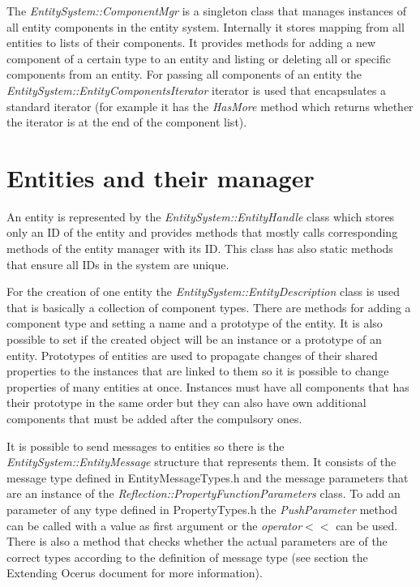 \documentclass[a4paper, 12pt]{report}
\begin{document}
The \emph{EntitySystem::ComponentMgr} is a singleton class that manages instances of all entity components in the entity system. Internally it stores mapping from all entities to lists of their components. It provides methods for adding a new component of a certain type to an entity and listing or deleting all or specific components from an entity. For passing all components of an entity the \emph{EntitySystem::EntityComponentsIterator} iterator is used that encapsulates a standard iterator (for example it has the \emph{HasMore} method which returns whether the iterator is at the end of the component list).

\section{Entities and their manager}

An entity is represented by the \emph{EntitySystem::EntityHandle} class which sto\-res only an ID of the entity and provides methods that mostly calls corresponding methods of the entity manager with its ID. This class has also static methods that ensure all IDs in the system are unique.

For the creation of one entity the \emph{EntitySystem::EntityDescription} class is used that is basically a collection of component types. There are methods for adding a component type and setting a name and a prototype of the entity. It is also possible to set if the created object will be an instance or a prototype of an entity. Prototypes of entities are used to propagate changes of their shared properties to the instances that are linked to them so it is possible to change properties of many entities at once. Instances must have all components that has their prototype in the same order but they can also have own additional components that must be added after the compulsory ones.

It is possible to send messages to entities so there is the \emph{EntitySystem::EntityMessage} structure that represents them. It consists of the message type defined in EntityMessageTypes.h and the message parameters that are an instance of the \emph{Reflection::PropertyFunctionParameters} class. To add an parameter of any type defined in PropertyTypes.h the \emph{PushParameter} method can be called with a value as first argument or the \emph{operator}$<<$ can be used. There is also a method that checks whether the actual parameters are of the correct types according to the definition of message type (see section the Extending Ocerus document for more information).
\end{document}

